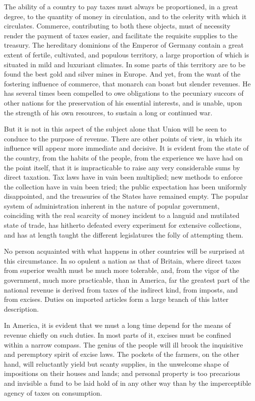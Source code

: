 The ability of a country to pay taxes must always be proportioned, in a great degree, to the quantity of money in circulation, and to the celerity with which it circulates. 
Commerce, contributing to both these objects, must of necessity render the payment of taxes easier, and facilitate the requisite supplies to the treasury. 
The hereditary dominions of the Emperor of Germany contain a great extent of fertile, cultivated, and populous territory, a large proportion of which is situated in mild and luxuriant climates. 
In some parts of this territory are to be found the best gold and silver mines in Europe. 
And yet, from the want of the fostering influence of commerce, that monarch can boast but slender revenues. 
He has several times been compelled to owe obligations to the pecuniary succors of other nations for the preservation of his essential interests, and is unable, upon the strength of his own resources, to sustain a long or continued war.

But it is not in this aspect of the subject alone that Union will be seen to conduce to the purpose of revenue. 
There are other points of view, in which its influence will appear more immediate and decisive. 
It is evident from the state of the country, from the habits of the people, from the experience we have had on the point itself, that it is impracticable to raise any very considerable sums by direct taxation. 
Tax laws have in vain been multiplied; new methods to enforce the collection have in vain been tried; the public expectation has been uniformly disappointed, and the treasuries of the States have remained empty. 
The popular system of administration inherent in the nature of popular government, coinciding with the real scarcity of money incident to a languid and mutilated state of trade, has hitherto defeated every experiment for extensive collections, and has at length taught the different legislatures the folly of attempting them.

No person acquainted with what happens in other countries will be surprised at this circumstance. 
In so opulent a nation as that of Britain, where direct taxes from superior wealth must be much more tolerable, and, from the vigor of the government, much more practicable, than in America, far the greatest part of the national revenue is derived from taxes of the indirect kind, from imposts, and from excises. 
Duties on imported articles form a large branch of this latter description.

In America, it is evident that we must a long time depend for the means of revenue chiefly on such duties. 
In most parts of it, excises must be confined within a narrow compass. 
The genius of the people will ill brook the inquisitive and peremptory spirit of excise laws. 
The pockets of the farmers, on the other hand, will reluctantly yield but scanty supplies, in the unwelcome shape of impositions on their houses and lands; and personal property is too precarious and invisible a fund to be laid hold of in any other way than by the imperceptible agency of taxes on consumption.

